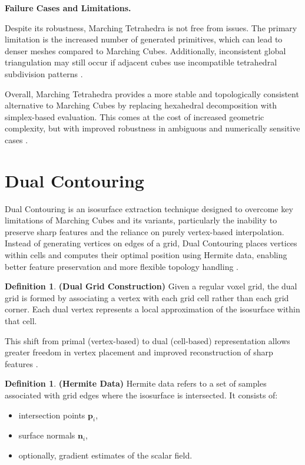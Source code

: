 \documentclass[12pt, a4paper, oneside]{book}
\theoremstyle{plain}
\theoremstyle{definition}
\newtheorem{definition}[theorem]{Definition}
\theoremstyle{remark}
\theoremstyle{definition}
\begin{document}
\textbf{Failure Cases and Limitations.}

Despite its robustness, Marching Tetrahedra is not free from issues. The primary limitation is the increased number of generated primitives, which can lead to denser meshes compared to Marching Cubes. Additionally, inconsistent global triangulation may still occur if adjacent cubes use incompatible tetrahedral subdivision patterns \cite{nielson2008dual}.

\vspace{0.5em}

Overall, Marching Tetrahedra provides a more stable and topologically consistent alternative to Marching Cubes by replacing hexahedral decomposition with simplex-based evaluation. This comes at the cost of increased geometric complexity, but with improved robustness in ambiguous and numerically sensitive cases \cite{shirley1990marching,treece1999regularised,nielson2008dual}.


\section{Dual Contouring}

Dual Contouring is an isosurface extraction technique designed to overcome key limitations of Marching Cubes and its variants, particularly the inability to preserve sharp features and the reliance on purely vertex-based interpolation. Instead of generating vertices on edges of a grid, Dual Contouring places vertices within cells and computes their optimal position using Hermite data, enabling better feature preservation and more flexible topology handling \cite{ju2002dual}.

\vspace{0.5em}

\begin{definition}
    \textbf{(Dual Grid Construction)}
Given a regular voxel grid, the dual grid is formed by associating a vertex with each grid cell rather than each grid corner. Each dual vertex represents a local approximation of the isosurface within that cell.
\end{definition}


This shift from primal (vertex-based) to dual (cell-based) representation allows greater freedom in vertex placement and improved reconstruction of sharp features \cite{ju2002dual}.

\vspace{0.5em}

\begin{definition}
    \textbf{(Hermite Data)}
Hermite data refers to a set of samples associated with grid edges where the isosurface is intersected. It consists of:
\begin{itemize}
    \item intersection points $\mathbf{p}_i$,
    \item surface normals $\mathbf{n}_i$,
    \item optionally, gradient estimates of the scalar field.
\end{itemize}
\end{definition}
\end{document}
